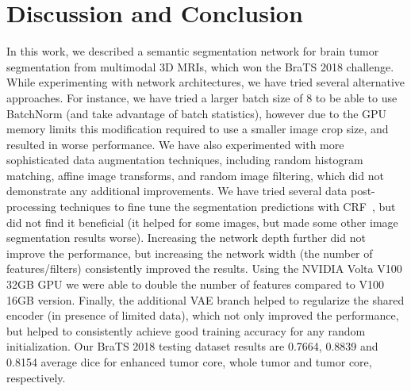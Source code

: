 \documentclass[runningheads]{llncs}
\newcommand{\0}{\ensuremath{\mathbf{0}}}
\newcommand{\1}{\ensuremath{\mathbf{1}}}
\begin{document}
 
\section{Discussion and Conclusion}
 \label{sec:conclusion}
 
In this work, we described a semantic segmentation network for brain tumor segmentation from multimodal 3D MRIs, which won the BraTS 2018 challenge. 
While experimenting with network architectures, we have tried several alternative approaches. For instance, we have tried a larger batch size of 8  to be able to use BatchNorm (and take advantage of batch statistics), however due to the GPU memory limits this modification required to use a smaller image crop size, and resulted in worse performance. We have also experimented with more sophisticated data augmentation techniques, including random histogram matching, affine image transforms, and random image filtering, which did not demonstrate any additional improvements.  We have tried several data post-processing techniques to fine tune the segmentation predictions with CRF~\cite{Kamnitsas16}, but did not find it beneficial (it helped for some images, but made some other image segmentation results worse).  Increasing the network depth further did not improve the performance, but increasing the network width (the number of features/filters) consistently improved the results. Using the NVIDIA Volta V100 32GB GPU we were able to double the number of features compared to V100 16GB version. Finally, the additional VAE branch helped to regularize the shared encoder (in presence of limited data), which not only improved the performance, but helped to consistently achieve good training accuracy for any random initialization.  Our BraTS 2018 testing dataset results are 0.7664, 0.8839 and 0.8154 average dice for enhanced tumor core, whole tumor and tumor core, respectively. 




\end{document}
